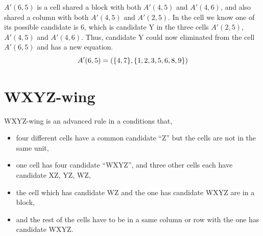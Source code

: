 \documentclass[11pt]{report}
\newcommand{\set}[1]{\{ #1 \}}
\begin{document}
$A'(6,5)$ is a cell shared a block with both $A'(4,5)$ and $A'(4,6)$, and also shared a column with both $A'(4,5)$ and $A'(2,5)$. In the cell we know one  of its possible candidate is  6, which is candidate Y in the three cells $A'(2,5)$, $A'(4,5)$ and $A'(4,6)$. Thus, candidate Y could now eliminated from the cell $A'(6,5)$ and has a new equation.
\begin{displaymath}
A'(6,5) = (\set{4,7}, \set{1, 2, 3, 5, 6, 8, 9})\\
\end{displaymath}




\section{WXYZ-wing}
\label{sec:WXYZ-wing}

WXYZ-wing is an advanced rule in a conditions that,
\begin{itemize}
\item four different cells have a common candidate ``Z'' but the cells are not in the same unit,
\item one cell has four candidate ``WXYZ'', and three other cells each have candidate XZ, YZ, WZ,
\item the cell which has candidate WZ and the one has candidate WXYZ are in a block,
\item and the rest of the cells have to be in a same column or row with the one has candidate WXYZ.
\end{itemize}
\end{document}
